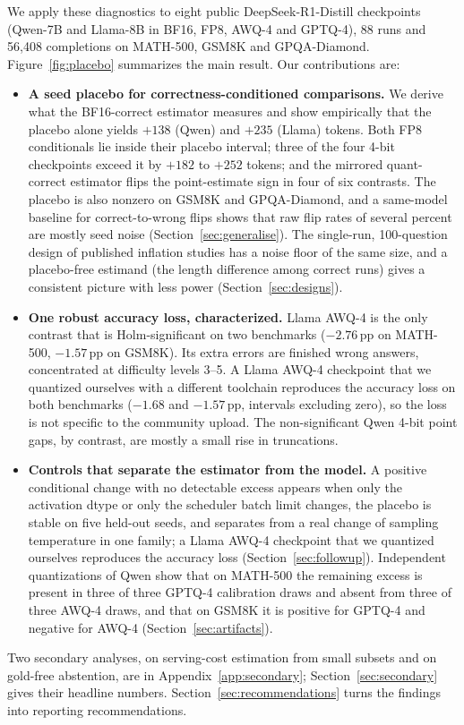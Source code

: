 \documentclass[11pt,a4paper]{article}
\begin{document}
We apply these diagnostics to eight public DeepSeek-R1-Distill checkpoints (Qwen-7B and Llama-8B in BF16, FP8, AWQ-4 and GPTQ-4), 88 runs and 56{,}408 completions on MATH-500, GSM8K and GPQA-Diamond. Figure~\ref{fig:placebo} summarizes the main result. Our contributions are:
\begin{itemize}
    \item[\textbf{C1}] \textbf{A seed placebo for correctness-conditioned comparisons.} We derive what the BF16-correct estimator measures and show empirically that the placebo alone yields $+138$ (Qwen) and $+235$ (Llama) tokens. Both FP8 conditionals lie inside their placebo interval; three of the four 4-bit checkpoints exceed it by $+182$ to $+252$ tokens; and the mirrored quant-correct estimator flips the point-estimate sign in four of six contrasts. The placebo is also nonzero on GSM8K and GPQA-Diamond, and a same-model baseline for correct-to-wrong flips shows that raw flip rates of several percent are mostly seed noise (Section~\ref{sec:generalise}). The single-run, 100-question design of published inflation studies has a noise floor of the same size, and a placebo-free estimand (the length difference among correct runs) gives a consistent picture with less power (Section~\ref{sec:designs}).
    \item[\textbf{C2}] \textbf{One robust accuracy loss, characterized.} Llama AWQ-4 is the only contrast that is Holm-significant on two benchmarks ($-2.76$\,pp on MATH-500, $-1.57$\,pp on GSM8K). Its extra errors are finished wrong answers, concentrated at difficulty levels 3--5. A Llama AWQ-4 checkpoint that we quantized ourselves with a different toolchain reproduces the accuracy loss on both benchmarks ($-1.68$ and $-1.57$\,pp, intervals excluding zero), so the loss is not specific to the community upload. The non-significant Qwen 4-bit point gaps, by contrast, are mostly a small rise in truncations.
    \item[\textbf{C3}] \textbf{Controls that separate the estimator from the model.} A positive conditional change with no detectable excess appears when only the activation dtype or only the scheduler batch limit changes, the placebo is stable on five held-out seeds, and separates from a real change of sampling temperature in one family; a Llama AWQ-4 checkpoint that we quantized ourselves reproduces the accuracy loss (Section~\ref{sec:followup}). Independent quantizations of Qwen show that on MATH-500 the remaining excess is present in three of three GPTQ-4 calibration draws and absent from three of three AWQ-4 draws, and that on GSM8K it is positive for GPTQ-4 and negative for AWQ-4 (Section~\ref{sec:artifacts}).
\end{itemize}
Two secondary analyses, on serving-cost estimation from small subsets and on gold-free abstention, are in Appendix~\ref{app:secondary}; Section~\ref{sec:secondary} gives their headline numbers. Section~\ref{sec:recommendations} turns the findings into reporting recommendations.
\end{document}
